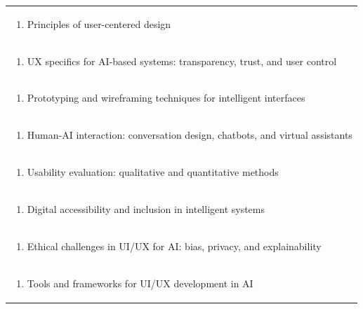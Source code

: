 \documentclass[11pt]{article}
\begin{document}
\begin{center}
\begin{longtable}{|p{4cm}|p{4cm}|p{4cm}|p{4cm}|}
\multicolumn{4}{|p{\dimexpr 16cm + 6\tabcolsep\relax}|}{\begin{enumerate}[start=2]\item Principles of user-centered design\end{enumerate}}\\
\multicolumn{4}{|p{\dimexpr 16cm + 6\tabcolsep\relax}|}{\begin{enumerate}[start=3]\item UX specifics for AI-based systems: transparency, trust, and user control\end{enumerate}}\\
\multicolumn{4}{|p{\dimexpr 16cm + 6\tabcolsep\relax}|}{\begin{enumerate}[start=4]\item Prototyping and wireframing techniques for intelligent interfaces\end{enumerate}}\\
\multicolumn{4}{|p{\dimexpr 16cm + 6\tabcolsep\relax}|}{\begin{enumerate}[start=5]\item Human-AI interaction: conversation design, chatbots, and virtual assistants\end{enumerate}}\\
\multicolumn{4}{|p{\dimexpr 16cm + 6\tabcolsep\relax}|}{\begin{enumerate}[start=6]\item Usability evaluation: qualitative and quantitative methods\end{enumerate}}\\
\multicolumn{4}{|p{\dimexpr 16cm + 6\tabcolsep\relax}|}{\begin{enumerate}[start=7]\item Digital accessibility and inclusion in intelligent systems\end{enumerate}}\\
\multicolumn{4}{|p{\dimexpr 16cm + 6\tabcolsep\relax}|}{\begin{enumerate}[start=8]\item Ethical challenges in UI/UX for AI: bias, privacy, and explainability\end{enumerate}}\\
\multicolumn{4}{|p{\dimexpr 16cm + 6\tabcolsep\relax}|}{\begin{enumerate}[start=9]\item Tools and frameworks for UI/UX development in AI\end{enumerate}}\\

\end{longtable}
\end{center}
\end{document}
